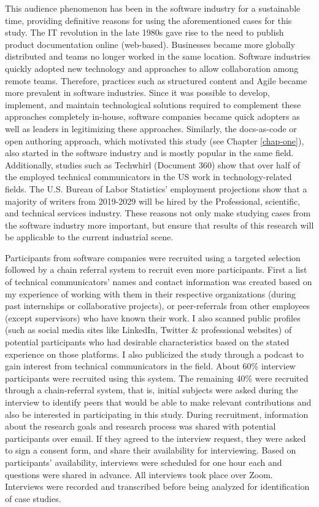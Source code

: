 This audience phenomenon has been in the software industry for a sustainable time, providing definitive reasons for using the aforementioned cases for this study. The IT revolution in the late 1980s gave rise to the need to publish product documentation online (web-based). Businesses became more globally distributed and teams no longer worked in the same location. Software industries quickly adopted new technology and approaches to allow collaboration among remote teams. Therefore, practices such as structured content and Agile became more prevalent in software industries. Since it was possible to develop, implement, and maintain technological solutions required to complement these approaches completely in-house, software companies became quick adopters as well as leaders in legitimizing these approaches. Similarly, the docs-as-code or open authoring approach, which motivated this study (see Chapter \ref{chap-one}), also started in the software industry and is mostly popular in the same field. Additionally, studies such as Techwhirl (Document 360) show that over half of the employed technical communicators in the US work in technology-related fields. The U.S. Bureau of Labor Statistics’ employment projections show that a majority of writers from 2019-2029 will be hired by the Professional, scientific, and technical services industry. These reasons not only make studying cases from the software industry more important, but ensure that results of this research will be applicable to the current industrial scene.

Participants from software companies were recruited using a targeted selection followed by a chain referral system to recruit even more participants. First a list of technical communicators’ names and contact information was created based on my experience of working with them in their respective organizations (during past internships or collaborative projects), or peer-referrals from other employees (except supervisors) who have known their work. I also scanned public profiles (such as social media sites like LinkedIn, Twitter  \& professional websites) of potential participants who had desirable characteristics based on the stated experience on those platforms. I also publicized the study through a podcast to gain interest from technical communicators in the field. About 60\% interview participants were recruited using this system. The remaining 40\% were recruited through a chain-referral system, that is, initial subjects were asked during the interview to identify peers that would be able to make relevant contributions and also be interested in participating in this study. During recruitment, information about the research goals and research process was shared with potential participants over email. If they agreed to the interview request, they were asked to sign a consent form, and share their availability for interviewing. Based on participants’ availability, interviews were scheduled for one hour each and questions were shared in advance. All interviews took place over Zoom. Interviews were recorded and transcribed before being analyzed for identification of case studies.

